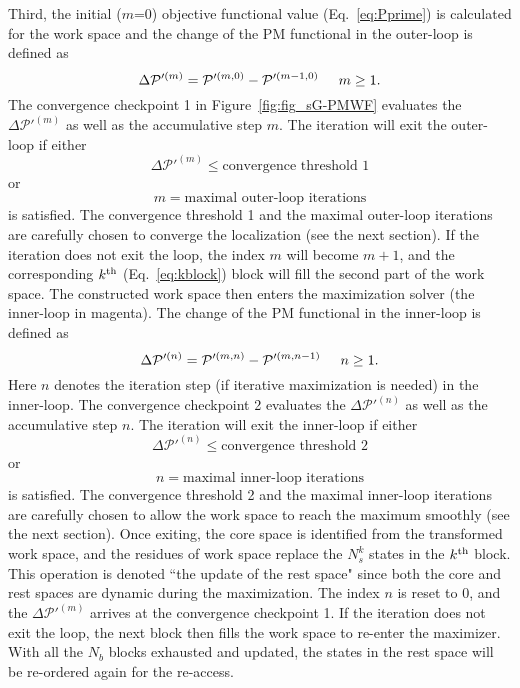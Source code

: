 \documentclass[journal=jacsat,manuscript=article]{achemso}
\begin{document}
Third, the initial ($m$=0) objective functional value (Eq.~\eqref{eq:Pprime}) is calculated for the work space and the change of the PM functional in the outer-loop is defined as
\begin{equation}\label{eq:deltaPm}
\Delta \mathcal{P}'^{(m)} = \mathcal{P}'^{(m,0)} - \mathcal{P}'^{(m-1,0)} \hspace{5mm} m \ge 1.
\end{equation} 
The convergence checkpoint 1 in Figure~\ref{fig:fig_sG-PMWF} evaluates the $\Delta \mathcal{P}'^{(m)}$ as well as the accumulative step $m$. The iteration will exit the outer-loop if either 
\begin{equation}\label{eq:convergence1}
\Delta \mathcal{P}'^{(m)} \le \text{convergence threshold 1}
\end{equation} 
or
\begin{equation}\label{eq:maxiter1}
m = \text{maximal outer-loop iterations}
\end{equation} 
is satisfied. The convergence threshold 1 and the maximal outer-loop iterations are carefully chosen to converge the localization (see the next section). If the iteration does not exit the loop, the index $m$ will become $m+1$, and the corresponding $k^{\rm th}$ (Eq.~\ref{eq:kblock}) block will fill the second part of the work space. The constructed work space then enters the maximization solver (the inner-loop in magenta). The change of the PM functional in the inner-loop is defined as
\begin{equation}\label{eq:deltaPn}
\Delta \mathcal{P}'^{(n)} = \mathcal{P}'^{(m,n)} - \mathcal{P}'^{(m,n-1)} \hspace{5mm} n \ge 1.
\end{equation}
Here $n$ denotes the iteration step (if iterative maximization is needed) in the inner-loop. The convergence checkpoint 2 evaluates the $\Delta \mathcal{P}'^{(n)}$ as well as the accumulative step $n$. The iteration will exit the inner-loop if either
\begin{equation}\label{eq:convergence2}
\Delta \mathcal{P}'^{(n)} \le \text{convergence threshold 2}
\end{equation} 
or
\begin{equation}\label{eq:maxiter2}
n = \text{maximal inner-loop iterations}
\end{equation} 
is satisfied. The convergence threshold 2 and the maximal inner-loop iterations are carefully chosen to allow the work space to reach the maximum smoothly (see the next section). Once exiting, the core space is identified from the transformed work space, and the residues of work space replace the $N_{s}^{k}$ states in the $k^{\rm th}$ block. This operation is denoted ``the update of the rest space" since both the core and rest spaces are dynamic during the maximization. The index $n$ is reset to 0, and the $\Delta \mathcal{P}'^{(m)}$ arrives at the convergence checkpoint 1. If the iteration does not exit the loop, the next block then fills the work space to re-enter the maximizer. With all the $N_b$ blocks exhausted and updated, the states in the rest space will be re-ordered again for the re-access.
\end{document}
